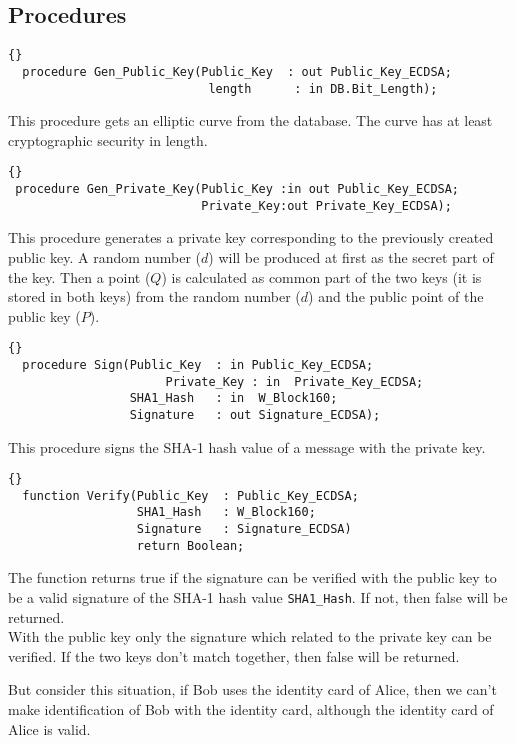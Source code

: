 \subsection*{Procedures}
\begin{lstlisting}{}
  procedure Gen_Public_Key(Public_Key  : out Public_Key_ECDSA;
			               	length      : in DB.Bit_Length);
\end{lstlisting}
This procedure gets an elliptic curve from the database. The curve has
at least cryptographic security in length.

\hhline
\begin{lstlisting}{}
 procedure Gen_Private_Key(Public_Key :in out Public_Key_ECDSA;
                           Private_Key:out Private_Key_ECDSA);
\end{lstlisting}
This procedure generates a private key corresponding to the previously
created public key. A random number ($d$) will be produced at first as
the secret part of the key. Then a point ($Q$) is calculated as common
part of the two keys (it is stored in both keys) from the random
number ($d$) and the public point of the public key ($P$).

\hhline
\begin{lstlisting}{}
  procedure Sign(Public_Key  : in Public_Key_ECDSA;
		 			  Private_Key : in  Private_Key_ECDSA;
                 SHA1_Hash   : in  W_Block160;
                 Signature   : out Signature_ECDSA);
\end{lstlisting}
This procedure signs the SHA-1 hash value of a message with the private key.\\

\hhline
\begin{lstlisting}{}
  function Verify(Public_Key  : Public_Key_ECDSA;
                  SHA1_Hash   : W_Block160;
                  Signature   : Signature_ECDSA)
                  return Boolean;
\end{lstlisting}
The function returns true if the signature can be verified with the
public key to be a valid signature of the SHA-1 hash value
\texttt{SHA1\_Hash}. If not, then false will be returned.\\ With the
public key only the signature which related to the private key can be
verified. If the two keys don't match together, then false will be
returned.

But consider this situation, if Bob uses the identity card of Alice,
then we can't make identification of Bob with the identity card,
although the identity card of Alice is valid.

